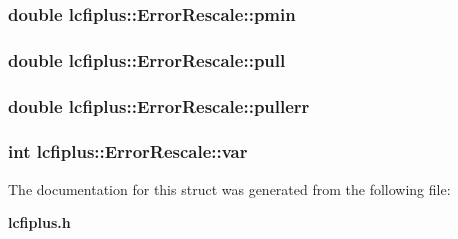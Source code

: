 \subsubsection[{pmin}]{\setlength{\rightskip}{0pt plus 5cm}double lcfiplus\-::\-Error\-Rescale\-::pmin}\label{structlcfiplus_1_1ErrorRescale_aac813cb2fedcea439622c2490bcaba32}
\subsubsection[{pull}]{\setlength{\rightskip}{0pt plus 5cm}double lcfiplus\-::\-Error\-Rescale\-::pull}\label{structlcfiplus_1_1ErrorRescale_a330ae724fc5d6330f1ff2849a28abd26}
\subsubsection[{pullerr}]{\setlength{\rightskip}{0pt plus 5cm}double lcfiplus\-::\-Error\-Rescale\-::pullerr}\label{structlcfiplus_1_1ErrorRescale_a1b21869c63577092a2c84935c65b9c4a}
\subsubsection[{var}]{\setlength{\rightskip}{0pt plus 5cm}int lcfiplus\-::\-Error\-Rescale\-::var}\label{structlcfiplus_1_1ErrorRescale_a75f1fa681083bae771778f1b3a39450c}


The documentation for this struct was generated from the following file\-:\begin{DoxyCompactItemize}
\item 
{\bf lcfiplus.\-h}\end{DoxyCompactItemize}

